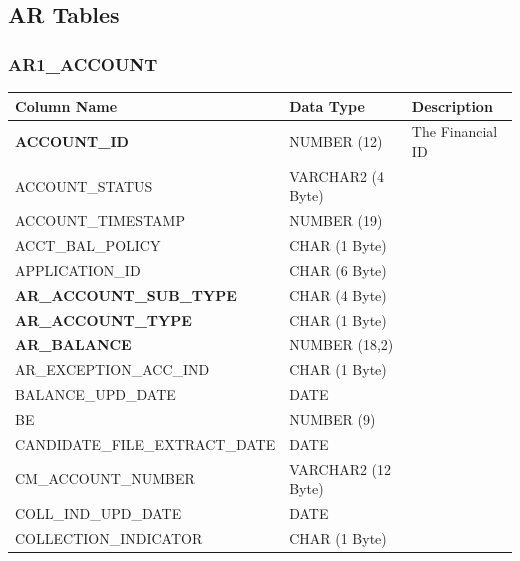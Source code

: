 \documentclass[12pt,twoside]{article}
\begin{document}
\subsection{AR Tables}
\label{sec-11-6}
\subsubsection{AR1\_ACCOUNT}
\label{sec-11-6-1}

\scriptsize

\begin{center}
\begin{tabular}{lll}
\hline
 \textbf{Column Name}             &  \textbf{Data Type}  &  \textbf{Description}  \\
\hline
 \textbf{ACCOUNT\_ID}             &  NUMBER (12)         &  The Financial ID      \\
 ACCOUNT\_STATUS                  &  VARCHAR2 (4 Byte)   &                        \\
 ACCOUNT\_TIMESTAMP               &  NUMBER (19)         &                        \\
 ACCT\_BAL\_POLICY                &  CHAR (1 Byte)       &                        \\
 APPLICATION\_ID                  &  CHAR (6 Byte)       &                        \\
 \textbf{AR\_ACCOUNT\_SUB\_TYPE}  &  CHAR (4 Byte)       &                        \\
 \textbf{AR\_ACCOUNT\_TYPE}       &  CHAR (1 Byte)       &                        \\
 \textbf{AR\_BALANCE}             &  NUMBER (18,2)       &                        \\
 AR\_EXCEPTION\_ACC\_IND          &  CHAR (1 Byte)       &                        \\
 BALANCE\_UPD\_DATE               &  DATE                &                        \\
 BE                               &  NUMBER (9)          &                        \\
 CANDIDATE\_FILE\_EXTRACT\_DATE   &  DATE                &                        \\
 CM\_ACCOUNT\_NUMBER              &  VARCHAR2 (12 Byte)  &                        \\
 COLL\_IND\_UPD\_DATE             &  DATE                &                        \\
 COLLECTION\_INDICATOR            &  CHAR (1 Byte)       &                        \\

\end{tabular}
\end{center}
\end{document}
